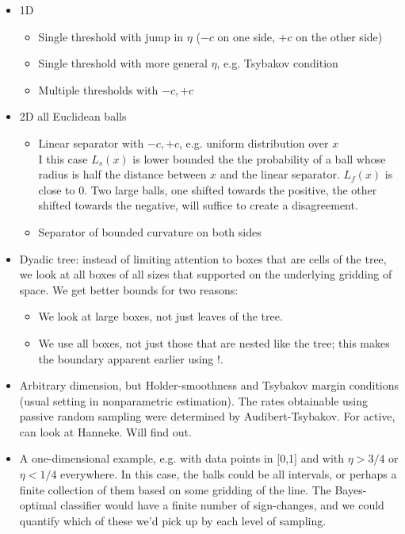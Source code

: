 \documentclass{article}
\begin{document}
\begin{itemize}
    \item 1D
    \begin{itemize}
        \item Single threshold with jump in $\eta$ ($-c$ on one side, $+c$ on the other side)
        \item Single threshold with more general $\eta$, e.g. Tsybakov condition
        \item Multiple thresholds with $-c, +c$
    \end{itemize}
    \item 2D all Euclidean balls
    \begin{itemize}
        \item Linear separator with $-c, +c$, e.g. uniform distribution over $x$\\
        I this case $L_s(x)$ is lower bounded the the probability of a
        ball whose radius is half the distance between $x$ and the
        linear separator. $L_f(x)$ is close to 0. Two large balls, one
        shifted towards the positive, the other shifted towards the
        negative, will suffice to create a disagreement.

        \item Separator of bounded curvature on both sides
    \end{itemize}
    \item Dyadic tree: instead of limiting attention to boxes that are cells of the tree, we look at all boxes of all sizes that supported on the underlying gridding of space. We get better bounds for two reasons:
    \begin{itemize}
        \item We look at large boxes, not just leaves of the tree.
        \item We use all boxes, not just those that are nested like the tree; this makes the boundary apparent earlier using !.
    \end{itemize}
    \item Arbitrary dimension, but Holder-smoothness and Tsybakov margin conditions (usual setting in nonparametric estimation). The rates obtainable using passive random sampling were determined by Audibert-Tsybakov. For active, can look at Hanneke. Will find out.
    \item A one-dimensional example, e.g. with data points in [0,1] and with
$\eta > 3/4$ or $\eta < 1/4$ everywhere. In this case, the balls could
be all intervals, or perhaps a finite collection of them based on some
gridding of the line. The Bayes-optimal classifier would have a finite
number of sign-changes, and we could quantify which of these we'd pick
up by each level of sampling.


\end{itemize}
\end{document}
